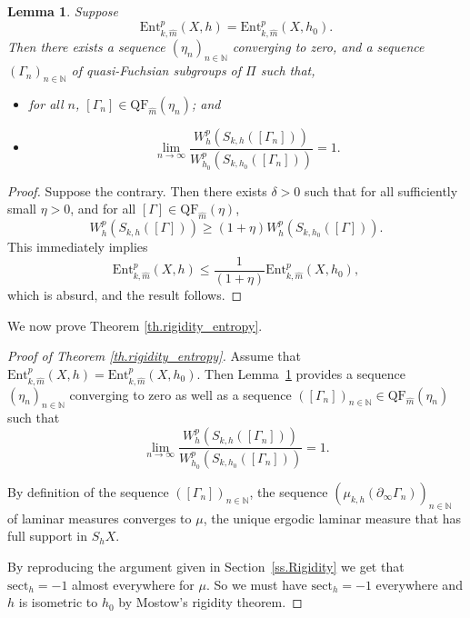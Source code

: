 \documentclass[10pt]{amsart}
\theoremstyle{plain}
\newtheorem{lemma}[theorem]{Lemma}
\theoremstyle{definition}
\newcommand{\sect}{\mathrm{sect}}
\newcommand{\Ent}{\mathrm{Ent}}
\newcommand{\QF}{\mathrm{QF}}
\newcommand{\bord}{\partial_{\infty}}
\begin{document}
\begin{lemma}\label{lem_converging_sequence}
Suppose
\begin{equation*}
\Ent^{p}_{k,\hat m}(X,h)=\Ent^{p}_{k,\hat m}(X,h_0).
\end{equation*}
Then there exists a sequence $(\eta_n)_{n\in\mathbb{N}}$ converging to zero, and a sequence $(\Gamma_n)_{n\in\mathbb{N}}$ of quasi-Fuchsian subgroups of $\Pi$ such that,
\begin{itemize}
\item for all $n$, $[\Gamma_n]\in\QF_{\hat m}(\eta_n)$; and
\item
\begin{equation*}
\lim_{n\to\infty}\frac{W^{p}_{h}(S_{k,h}([\Gamma_n]))}{W^{p}_{h_0}(S_{k,h_0}([\Gamma_n]))}=1.
\end{equation*}
\end{itemize}
\end{lemma}

\begin{proof}
Suppose the contrary. Then there exists $\delta>0$ such that for all sufficiently small $\eta>0$, and for all $[\Gamma]\in\QF_{\hat m}(\eta)$,
\begin{equation*}
W^{p}_{h}(S_{k,h}([\Gamma]))\geq (1+\eta) W^{p}_{h}(S_{k,h_0}([\Gamma])).
\end{equation*}
This immediately implies
\begin{equation*}
\Ent^p_{k,\hat m}(X,h)\leq\frac{1}{(1+\eta)}\Ent^{p}_{k,\hat m}(X,h_0),
\end{equation*}
which is absurd, and the result follows.
\end{proof}

We now prove Theorem \ref{th.rigidity_entropy}.

\begin{proof}[Proof of Theorem \ref{th.rigidity_entropy}] Assume that $\Ent^{p}_{k,\hat m}(X,h)=\Ent^{p}_{k,\hat m}(X,h_0)$. Then Lem\-ma~\ref{lem_converging_sequence} provides a sequence $(\eta_n)_{n\in\mathbb{N}}$ converging to zero as well as a sequence $([\Gamma_n])_{n\in\mathbb{N}}\in\QF_{\hat m}(\eta_n)$ such that
\begin{equation*}
\lim_{n\to\infty}\frac{W^{p}_{h}(S_{k,h}([\Gamma_n]))}{W^{p}_{h_0}(S_{k,h_0}([\Gamma_n]))}=1.
\end{equation*}

By definition of the sequence $([\Gamma_n])_{n\in\mathbb{N}}$, the sequence $(\mu_{k,h}(\bord \Gamma_n))_{n\in\mathbb{N}}$ of laminar measures converges to $\mu$, the unique ergodic laminar measure that has full support in $S_hX$.

By reproducing the argument given in Section~\ref{ss.Rigidity} we get that $\sect_h=-1$ almost everywhere for $\mu$. So we must have $\sect_h=-1$ everywhere and $h$ is isometric to $h_0$ by Mostow's rigidity theorem.
\end{proof}
\end{document}
